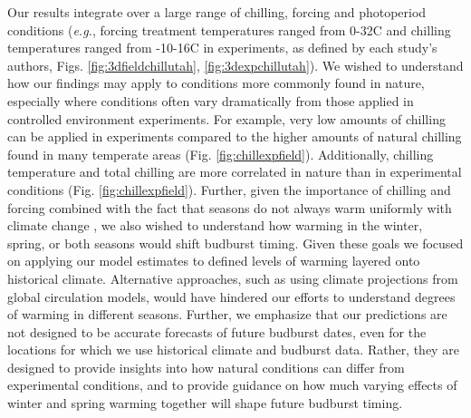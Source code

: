 \documentclass{article}
\begin{document}
Our results integrate over a large range of chilling, forcing and photoperiod conditions (\emph{e.g.}, forcing treatment temperatures ranged from 0-32\degree C and chilling temperatures ranged from -10-16\degree C in experiments, as defined by each study's authors, Figs. \ref{fig:3dfieldchillutah}, \ref{fig:3dexpchillutah}). We wished to understand how our findings may apply to conditions more commonly found in nature, especially where conditions often vary dramatically from those applied in controlled environment experiments. For example, very low amounts of chilling can be applied in experiments compared to the higher amounts of natural chilling found in many temperate areas (Fig. \ref{fig:chillexpfield}). Additionally, chilling temperature and total chilling are more correlated in nature than in experimental conditions (Fig. \ref{fig:chillexpfield}). Further, given the importance of chilling and forcing combined with the fact that seasons do not always warm uniformly with climate change \emph{\citep{vautard2014,eea2019}}, we also wished to understand how warming in the winter, spring, or both seasons would shift budburst timing. Given these goals we focused on applying our model estimates to defined levels of warming layered onto historical climate. Alternative approaches, such as using climate projections from global circulation models, would have hindered our efforts to understand degrees of warming in different seasons. Further, we emphasize that our predictions are not designed to be accurate forecasts of future budburst dates, even for the locations for which we use historical climate and budburst data. Rather, they are designed to provide insights into how natural conditions can differ from experimental conditions, and to provide guidance on how much varying effects of winter and spring warming together will shape future budburst timing.
\end{document}
